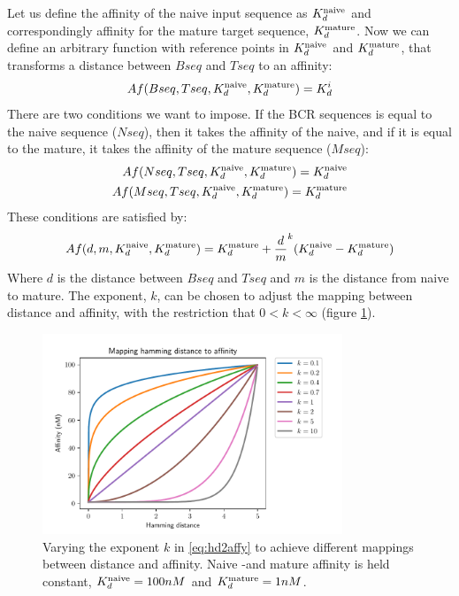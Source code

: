 Let us define the affinity of the naive input sequence as $K^{\text{naive}}_d$ and correspondingly affinity for the mature target sequence, $K^{\text{mature}}_d$.
Now we can define an arbitrary function with reference points in $K^{\text{naive}}_d$ and $K^{\text{mature}}_d$, that transforms a distance between $Bseq$ and $Tseq$ to an affinity:
$$
Af(Bseq, Tseq, K^{\text{naive}}_d, K^{\text{mature}}_d) = K^i_d
$$
There are two conditions we want to impose.
If the BCR sequences is equal to the naive sequence ($Nseq$), then it takes the affinity of the naive, and if it is equal to the mature, it takes the affinity of the mature sequence ($Mseq$):
\begin{equation}
\begin{split}
Af(Nseq, Tseq, K^{\text{naive}}_d, K^{\text{mature}}_d) = K^{\text{naive}}_d \\
Af(Mseq, Tseq, K^{\text{naive}}_d, K^{\text{mature}}_d) = K^{\text{mature}}_d
\end{split}
\label{eq:hd2affy_cond}
\end{equation}
These conditions are satisfied by:
\begin{equation}
Af(d, m, K^{\text{naive}}_d, K^{\text{mature}}_d) = K^{\text{mature}}_d + {\frac{d}{m}}^k (K^{\text{naive}}_d - K^{\text{mature}}_d)
\label{eq:hd2affy}
\end{equation}
Where $d$ is the distance between $Bseq$ and $Tseq$ and $m$ is the distance from naive to mature.
The exponent, $k$, can be chosen to adjust the mapping between distance and affinity, with the restriction that $0 < k < \infty$ (figure \ref{fig:hd2affy}).
\begin{figure}
    \centering
    \includegraphics[width=0.8\textwidth]{figures/hd2affy.pdf}
    \caption{
        \label{fig:hd2affy}
        Varying the exponent $k$ in \eqref{eq:hd2affy} to achieve different mappings between distance and affinity. Naive -and mature affinity is held constant, $K^{\text{naive}}_d = 100nM$ and $K^{\text{mature}}_d = 1nM$.
    }
\end{figure}

